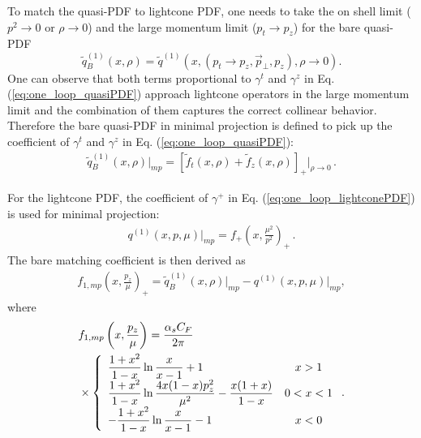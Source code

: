 To match the quasi-PDF to lightcone PDF, one needs to take the on shell limit ($p^2\to 0$ or $\rho\to0$) and the large momentum limit ($p_t\to p_z$) for the bare quasi-PDF
\begin{equation}
\widetilde{q}^{(1)}_B(x,\rho)=\widetilde{q}^{(1)}(x,(p_t\to p_z,\vec{p}_\perp,p_z),\rho\to 0).
\end{equation}
One can observe that both terms proportional to $\gamma^t$ and $\gamma^z$ in Eq. (\ref{eq:one_loop_quasiPDF}) approach lightcone operators in the large momentum limit  and the combination of them captures  the correct collinear behavior. Therefore the bare quasi-PDF in minimal projection is defined  to pick up the coefficient of $\gamma^t$ and $\gamma^z$ in Eq. (\ref{eq:one_loop_quasiPDF}):
\begin{align}
\widetilde{q}_B^{(1)}(x,\rho)\Big|_{mp}=\left[\widetilde{f}_t(x,\rho)+\widetilde{f}_z(x,\rho)\right]_+\bigg|_{\rho\to 0}\,.
\end{align}

For the lightcone PDF,  the coefficient of $\gamma^+$ in Eq. (\ref{eq:one_loop_lightconePDF}) is used for minimal projection:
\begin{align}
q^{(1)}(x,p,\mu)\Big|_{mp}= f_+\left(x,\frac{\mu^2}{p^2}\right)_+\,.
\end{align}
The bare matching coefficient is then derived as
\begin{align} \label{eq:mpbarematching}
f_{1,mp}\left(x,\frac{p_z}{\mu}\right)_+= \widetilde{q}^{(1)}_B(x,\rho)\Big|_{mp}-q^{(1)}(x,p,\mu)\bigg|_{mp},
\end{align}
where
\begin{align}
&f_{1,mp}\left(x,\frac{p_z}{\mu}\right)=\frac{\alpha_s C_F}{2\pi} \nonumber\\
&\times \left\{
\begin{array}{lc}
\displaystyle \frac{1+x^2}{1-x}\ln\frac{x}{x-1}+1 & x>1\\
\displaystyle \frac{1+x^2}{1-x}\ln\frac{4x(1-x)p_z^2}{\mu^2}-\frac{x(1+x)}{1-x} & 0<x<1\\
\displaystyle -\frac{1+x^2}{1-x}\ln\frac{x}{x-1}-1 & x<0
\end{array} \right. .
\end{align}


